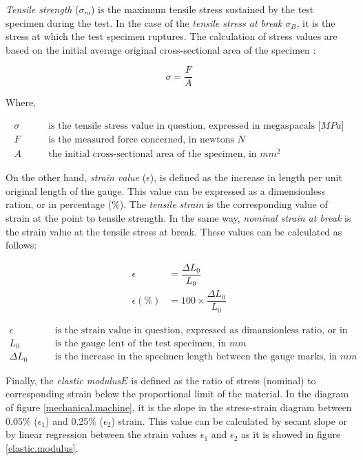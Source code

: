 \emph{Tensile strength} ($\sigma_{m}$) is the maximum tensile stress sustained by the test specimen during the test.
In the case of the \emph{tensile stress at break} $\sigma_{B}$, it is the stress at which the test specimen ruptures. 
The calculation of stress values are based on the initial average original cross-sectional area of the specimen :

\begin{equation}
\sigma= \dfrac{F}{A}
\end{equation}

Where, 

\begin{align*}
\sigma&\qquad  \text{is the tensile stress value in question, expressed in megaspacals [$MPa$]}\\
F& \qquad \text{is the measured force concerned, in newtons $N$}\\
A& \qquad \text{the initial cross-sectional area of the specimen, in $mm^{2}$}
\end{align*}

On the other hand,  \emph{strain value} ($\epsilon$), is defined as the increase in length per unit original length of the gauge. 
This value can be expressed as a dimensionless ration, or in percentage (\%). 
The \emph{tensile strain} is the corresponding  value of strain at the point  to tensile strength. 
In the same way, \emph{nominal strain at break} is the strain value at the tensile stress at break. 
These values can be calculated as follows:

\begin{align}
\epsilon&= \dfrac{\Delta L_{0}}{L_{0}}\\
\epsilon (\text{\%})&= 100 \times \dfrac{\Delta L_{0}}{L_{0}}
\end{align}

\begin{align*}
\epsilon& \qquad  \text{is the strain value in question, expressed as dimansionless ratio, or in percentage}\\
L_{0}&	\qquad \text{is the gauge lent of the test specimen, in $mm$}\\
\Delta L_{0}&	\qquad \text{is the increase in the specimen length between the gauge marks, in $mm$}
\end{align*}

Finally, the \emph{elastic modulus}$E$ is defined as the ratio of stress (nominal) to corresponding strain below the proportional limit of the material. 
In the diagram of figure \ref{mechanical.machine}, it is the slope in the stress-strain diagram between 0.05\% ($\epsilon_{1}$) and 0.25\% ($\epsilon_{2}$) strain. 
This value can be calculated by secant slope or by linear regression between the strain values $\epsilon_{1}$ and  $\epsilon_{2}$ as it is showed in  figure \ref{elastic.modulus}.

